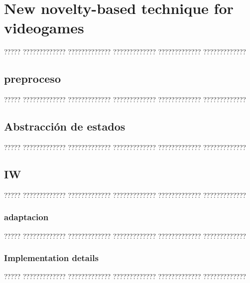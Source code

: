 \chapter{New novelty-based technique for videogames}

????? ????????????? ????????????? ????????????? ????????????? ????????????? 

\section{preproceso}

????? ????????????? ????????????? ????????????? ????????????? ????????????? 

\section{Abstracción de estados}

????? ????????????? ????????????? ????????????? ????????????? ????????????? 

\section{IW}

????? ????????????? ????????????? ????????????? ????????????? ????????????? 

\subsection{adaptacion}

????? ????????????? ????????????? ????????????? ????????????? ????????????? 


\subsection{Implementation details}


????? ????????????? ????????????? ????????????? ????????????? ????????????? 